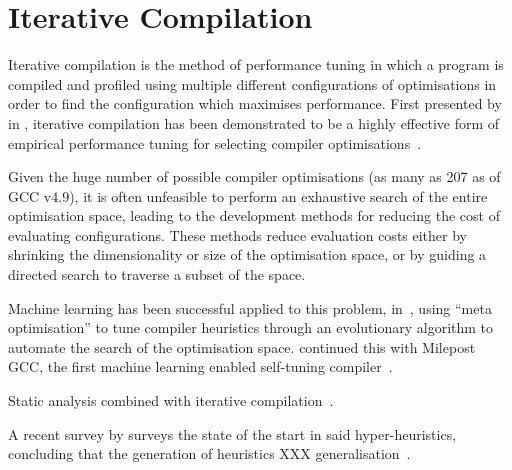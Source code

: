 \section{Iterative Compilation}\label{sec:iterative-compilation}

Iterative compilation is the method of performance tuning in which a
program is compiled and profiled using multiple different
configurations of optimisations in order to find the configuration
which maximises performance. First presented by \citeauthor{Bodin1998}
in \citeyear{Bodin1998}, iterative compilation has been demonstrated
to be a highly effective form of empirical performance tuning for
selecting compiler optimisations~\cite{Bodin1998}.

Given the huge number of possible compiler optimisations (as many as
207 as of GCC v4.9), it is often unfeasible to perform an exhaustive
search of the entire optimisation space, leading to the development
methods for reducing the cost of evaluating configurations. These
methods reduce evaluation costs either by shrinking the dimensionality
or size of the optimisation space, or by guiding a directed search to
traverse a subset of the space.

Machine learning has been successful applied to this problem,
in~\cite{Stephenson2003}, using ``meta optimisation'' to tune compiler
heuristics through an evolutionary algorithm to automate the search of
the optimisation space. \citeauthor{Fursin2011} continued this with
Milepost GCC, the first machine learning enabled self-tuning
compiler~\cite{Fursin2011}.

Static analysis combined with iterative compilation~\cite{Runciman2014}.

A recent survey by \citeauthor{Burke2013} surveys the state of the
start in said hyper-heuristics, concluding that the generation of
heuristics XXX generalisation~\cite{Burke2013}.

%
%




